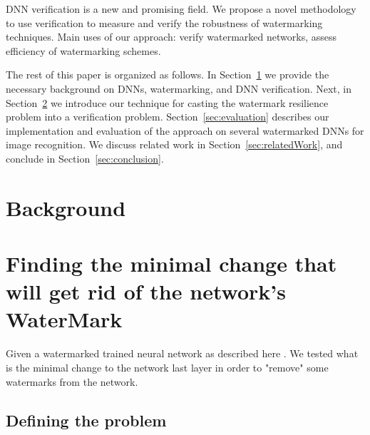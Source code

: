 \documentclass[a4paper]{llncs}
\newcommand{\guy}[1]{\marginpar{\textcolor{orange}{Guy: #1}}}
\begin{document}
DNN verification is a new and promising field. We propose a novel
methodology to use verification to measure and verify the robustness
of watermarking techniques.
Main uses of our approach: verify watermarked networks, assess
efficiency of watermarking schemes.

The rest of this paper is organized as follows. In
Section~\ref{sec:background} we provide the necessary background on
DNNs, watermarking, and DNN verification. Next, in
Section~\ref{sec:verifyWatermarks} we introduce our technique for
casting the watermark resilience problem into a verification
problem. Section~\ref{sec:evaluation} describes our implementation and evaluation of the approach on several watermarked DNNs for image
recognition. We discuss related work in Section~\ref{sec:relatedWork},
and conclude in Section~\ref{sec:conclusion}.

\section{Background}
\label{sec:background}

\cite{KaBaDiJuKo17Reluplex,KaHuIbJuLaLiShThWuZeDiKoBa19Marabou}

\section{Finding the minimal change that will get rid of the network's WaterMark}
\label{sec:verifyWatermarks}

Given a watermarked trained neural network as described
here \cite{AdBaPiKeWatermarking}.
\guy{make this a proper citation}
We
tested what is the minimal change to the network last layer in order
to "remove" some watermarks from the network.


\subsection{Defining the problem}
\label{sec:defineProblem}
\end{document}
